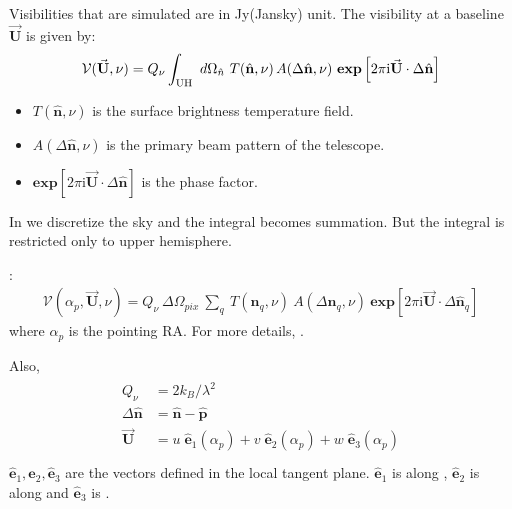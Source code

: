\documentclass[a4paper,11pt,oneside,english,openany]{sphinxmanual}
\begin{document}
\sphinxAtStartPar
Visibilities that are simulated are in Jy(Jansky) unit. The visibility at a baseline \(\vec{\textbf{U}}\) is given by:
\begin{equation*}
\begin{split}\mathcal{V}(\vec{\textbf{U}},\nu)=Q_\nu \int_{\rm UH}\ d\Omega_{\hat{n}}\ T(\hat{\mathbf{n}},\nu)\,{A}(\Delta\hat{\mathbf{n}},\nu)\ \textbf{exp}\left[{2\pi \text{i}\vec{\textbf{U}}\cdot\Delta\hat{\mathbf{n}}}\right]\end{split}
\end{equation*}\begin{itemize}
\item {} 
\sphinxAtStartPar
\(T(\hat{\mathbf{n}},\nu)\) is the surface brightness temperature field.

\item {} 
\sphinxAtStartPar
\({A}(\Delta\hat{\mathbf{n}},\nu)\) is the primary beam pattern of the telescope.

\item {} 
\sphinxAtStartPar
\(\textbf{exp}\left[{2\pi \text{i}\vec{\textbf{U}}\cdot\Delta\hat{\mathbf{n}}}\right]\) is the phase factor.

\end{itemize}

\sphinxAtStartPar
In  we discretize the sky and the integral becomes summation. But the integral is restricted only to  upper hemisphere.

\sphinxAtStartPar
{}:
\begin{equation*}
\begin{split}\mathcal{V}(\alpha_{p},\vec{\textbf{U}},\nu) = Q_{\nu}\ \Delta\Omega_{pix}\ \sum_{q} \ T(\hat{\mathbf{n}}_{q},\nu) \ {A}(\Delta\hat{\mathbf{n}}_{q},\nu) \ \textbf{exp}\left[{2\pi \text{i}\vec{\textbf{U}}\cdot\Delta\hat{\mathbf{n}}_{q}}\right]\end{split}
\end{equation*}
\sphinxAtStartPar
where \(\alpha_p\) is the pointing RA. For more details, .

\sphinxAtStartPar
Also,
\begin{align*}\!\begin{aligned}
Q_{\nu}  &=2k_B /\lambda^2\\
\Delta\hat{\mathbf{n}}&= \hat{\mathbf{n}}- \hat{\mathbf{p}}\\
\vec{\textbf{U}} &= u\;{\hat{\mathbf{e}}_ 1 (\alpha_{p})} + v \;{\hat{\mathbf{e}}_ 2 (\alpha_{p})} + w \;{\hat{\mathbf{e}}_3(\alpha_{p})}\\
\end{aligned}\end{align*}
\sphinxAtStartPar
\(\hat{\mathbf{e}}_1,\hat{\mathbf{e}}_2,\hat{\mathbf{e}}_3\) are the  vectors defined in the local tangent plane. \(\hat{\mathbf{e}}_1\) is along , \(\hat{\mathbf{e}}_2\) is along  and \(\hat{\mathbf{e}}_3\) is .
\end{document}
